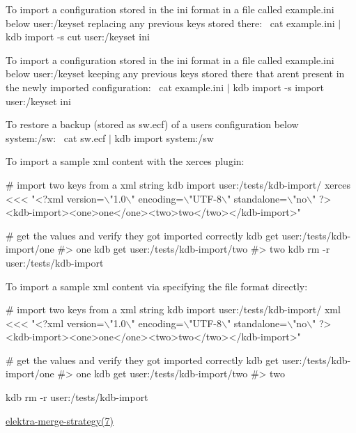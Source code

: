 To import a configuration stored in the {\ttfamily ini} format in a file called {\ttfamily example.\+ini} below {\ttfamily user\+:/keyset} replacing any previous keys stored there\+:~\newline
 {\ttfamily cat example.\+ini $\vert$ kdb import -\/s cut user\+:/keyset ini}

To import a configuration stored in the {\ttfamily ini} format in a file called {\ttfamily example.\+ini} below {\ttfamily user\+:/keyset} keeping any previous keys stored there that aren\textquotesingle{}t present in the newly imported configuration\+:~\newline
 {\ttfamily cat example.\+ini $\vert$ kdb import -\/s import user\+:/keyset ini}

To restore a backup (stored as {\ttfamily sw.\+ecf}) of a user\textquotesingle{}s configuration below {\ttfamily system\+:/sw}\+:~\newline
 {\ttfamily cat sw.\+ecf $\vert$ kdb import system\+:/sw}

To import a sample {\ttfamily xml} content with the {\ttfamily xerces} plugin\+:


\begin{DoxyCode}
# import two keys from a xml string
kdb import user:/tests/kdb-import/ xerces <<< "<?xml version=\(\backslash\)"1.0\(\backslash\)" encoding=\(\backslash\)"UTF-8\(\backslash\)" standalone=\(\backslash\)"no\(\backslash\)"
       ?><kdb-import><one>one</one><two>two</two></kdb-import>"

# get the values and verify they got imported correctly
kdb get user:/tests/kdb-import/one
#> one
kdb get user:/tests/kdb-import/two
#> two
kdb rm -r user:/tests/kdb-import
\end{DoxyCode}


To import a sample {\ttfamily xml} content via specifying the file format directly\+:


\begin{DoxyCode}
# import two keys from a xml string
kdb import user:/tests/kdb-import/ xml <<< "<?xml version=\(\backslash\)"1.0\(\backslash\)" encoding=\(\backslash\)"UTF-8\(\backslash\)" standalone=\(\backslash\)"no\(\backslash\)"
       ?><kdb-import><one>one</one><two>two</two></kdb-import>"

# get the values and verify they got imported correctly
kdb get user:/tests/kdb-import/one
#> one
kdb get user:/tests/kdb-import/two
#> two

kdb rm -r user:/tests/kdb-import
\end{DoxyCode}



\begin{DoxyItemize}
\item \hyperlink{doc_help_elektra-merge-strategy_md}{elektra-\/merge-\/strategy(7)} 
\end{DoxyItemize}